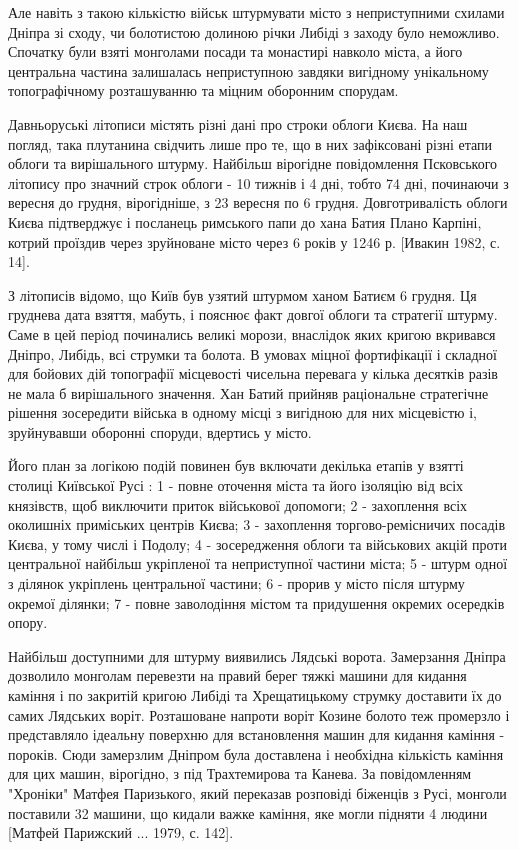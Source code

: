 Але навіть з такою кількістю військ штурмувати місто з неприступними схилами
Дніпра зі сходу, чи болотистою долиною річки Либіді з заходу було неможливо.
Спочатку були взяті монголами посади та монастирі навколо міста, а його
центральна частина залишалась неприступною завдяки вигідному унікальному
топографічному розташуванню та міцним оборонним спорудам.

Давньоруські літописи містять різні дані про строки облоги Києва. На наш
погляд, така плутанина свідчить лише про те, що в них зафіксовані різні етапи
облоги та вирішального штурму. Найбільш вірогідне повідомлення Псковського
літопису про значний строк облоги - 10 тижнів і 4 дні, тобто 74 дні, починаючи
з вересня до грудня, вірогідніше, з 23 вересня по 6 грудня. Довготривалість
облоги Києва підтверджує і посланець римського папи до хана Батия Плано
Карпіні, котрий проїздив через зруйноване місто через 6 років у 1246 р. [Ивакин
1982, с. 14].

З літописів відомо, що Київ був узятий штурмом ханом Батиєм 6 грудня. Ця
груднева дата взяття, мабуть, і пояснює факт довгої облоги та стратегії штурму.
Саме в цей період починались великі морози, внаслідок яких кригою вкривався
Дніпро, Либідь, всі струмки та болота. В умовах міцної фортифікації і складної
для бойових дій топографії місцевості чисельна перевага у кілька десятків разів
не мала б вирішального значення. Хан Батий прийняв раціональне стратегічне
рішення зосередити війська в одному місці з вигідною для них місцевістю і,
зруйнувавши оборонні споруди, вдертись у місто.

Його план за логікою подій повинен був включати декілька етапів у взятті
столиці Київської Русі : 1 - повне оточення міста та його ізоляцію від всіх
князівств, щоб виключити приток військової допомоги; 2 - захоплення всіх
околишніх приміських центрів Києва; 3 - захоплення торгово-ремісничих посадів
Києва, у тому числі і Подолу; 4 - зосередження облоги та військових акцій проти
центральної найбільш укріпленої та неприступної частини міста; 5 - штурм одної
з ділянок укріплень центральної частини; 6 - прорив у місто після штурму
окремої ділянки; 7 - повне заволодіння містом та придушення окремих осередків
опору.

Найбільш доступними для штурму виявились Лядські ворота. Замерзання Дніпра
дозволило монголам перевезти на правий берег тяжкі машини для кидання каміння і
по закритій кригою Либіді та Хрещатицькому струмку доставити їх до самих
Лядських воріт. Розташоване напроти воріт Козине болото теж промерзло і
представляло ідеальну поверхню для встановлення машин для кидання каміння -
пороків. Сюди замерзлим Дніпром була доставлена і необхідна кількість каміння
для цих машин, вірогідно, з під Трахтемирова та Канева. За повідомленням
"Хроніки" Матфея Паризького, який переказав розповіді біженців з Русі, монголи
поставили 32 машини, що кидали важке каміння, яке могли підняти 4 людини
[Матфей Парижский ... 1979, с. 142].

